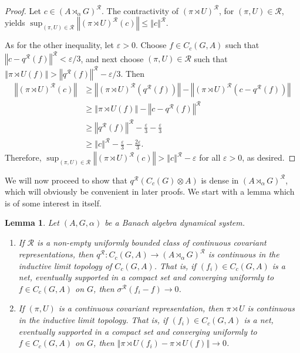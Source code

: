 \documentclass{amsart}
\theoremstyle{plain}
\newtheorem{lemma}[theorem]{Lemma}
\theoremstyle{definition}
\numberwithin{equation}{section}
\begin{document}
\begin{proof}
Let $c\in{(A {\rtimes}_\alpha G)^\mathcal{R}}$. The contractivity of $({\pi \rtimes U})^{\mathcal R}$, for ${(\pi,U)}\in\mathcal R$, yields $\sup_{{(\pi,U)} \in \mathcal{R}} {\left\Vert {({\pi \rtimes U})^{\mathcal R} (c)} \right\Vert}\leq {\left\Vert {c} \right\Vert^{\mathcal R}}$.

As for the other inequality, let ${\varepsilon}>0$. Choose $f\in C_c(G,A)$ such that ${\left\Vert {c-{q^{\mathcal R}}(f)} \right\Vert^{\mathcal R}}<{\varepsilon}/3$, and next choose ${(\pi,U)}\in\mathcal R$ such that ${\left\Vert {{\pi \rtimes U} (f)} \right\Vert}>{\left\Vert {{q^{\mathcal R}}(f)} \right\Vert^{\mathcal R}}-{\varepsilon}/3$. Then
\begin{align*}
{\left\Vert {({\pi \rtimes U})^{\mathcal R}(c)} \right\Vert} &\geq {\left\Vert {({\pi \rtimes U})^{\mathcal R} ({q^{\mathcal R}}(f))} \right\Vert} - {\left\Vert {({\pi \rtimes U})^{\mathcal R}(c - {q^{\mathcal R}}(f))} \right\Vert} \\
&\geq {\left\Vert {{\pi \rtimes U} (f)} \right\Vert} - {\left\Vert {c-{q^{\mathcal R}}(f)} \right\Vert^{\mathcal R}} \\
&\geq {\left\Vert {{q^{\mathcal R}}(f)} \right\Vert^{\mathcal R}}-\frac{\varepsilon}{3}-\frac{\varepsilon}{3} \\
&\geq {\left\Vert {c} \right\Vert^{\mathcal R}}-\frac{\varepsilon}{3} - \frac{2{\varepsilon}}{3}.
\end{align*}
Therefore, $\sup_{{(\pi,U)} \in \mathcal{R}} {\left\Vert {({\pi \rtimes U})^{\mathcal R} (c)} \right\Vert}>{\left\Vert {c} \right\Vert^{\mathcal R}}-{\varepsilon}$ for all ${\varepsilon}>0$, as desired.
\end{proof}

We will now proceed to show that ${q^{\mathcal R}}(C_c(G)\otimes A)$ is dense in ${(A {\rtimes}_\alpha G)^\mathcal{R}}$, which will obviously be convenient in later proofs. We start with a lemma which is of some interest in itself.

\begin{lemma}\label{l:quotient_map_continuous_in_inductive_limit_topology_on_C_c(G,A)}
 Let ${(A,G,\alpha)}$ be a Banach algebra dynamical system.
\begin{enumerate}
 \item If $\mathcal{R}$ is a non-empty uniformly bounded class of continuous covariant representations, then ${q^{\mathcal R}}:C_c(G,A)\to{(A {\rtimes}_\alpha G)^\mathcal{R}}$ is continuous in the inductive limit topology of $C_c(G,A)$. That is, if $(f_i) \in C_c(G,A)$ is a net, eventually supported in a compact set and converging uniformly to $f \in C_c(G,A)$ on $G$, then ${\sigma^{\mathcal R}}(f_i -f) \to 0$.
\item If ${(\pi,U)}$ is a continuous covariant representation, then ${\pi \rtimes U}$ is continuous in the inductive limit topology. That is, if $(f_i) \in C_c(G,A)$ is a net, eventually supported in a compact set and converging uniformly to $f \in C_c(G,A)$ on $G$, then ${\left\Vert {{\pi \rtimes U}(f_i) - {\pi \rtimes U}(f)} \right\Vert} \to 0$.
\end{enumerate}
\end{lemma}
\end{document}
